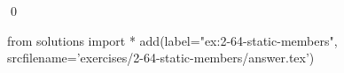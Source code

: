 
\begin{ex}
  \label{ex:2-64-static-members}
  
  \qed
\end{ex}
\begin{python0}
from solutions import *
add(label="ex:2-64-static-members",
    srcfilename='exercises/2-64-static-members/answer.tex')
\end{python0}
